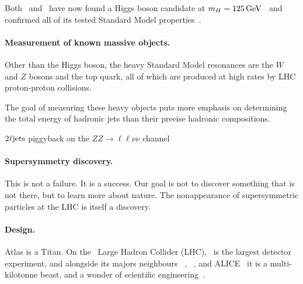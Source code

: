 Both \atlas\ and \cms\ have now found a Higgs boson candidate at
$m_H = 125\,\eV[G]$~\cite{
atlas2012higgs,
atlas2012combined,
cms2012higgs
}
and confirmed all of its tested Standard Model properties~\cite{
combined2016higgs,
atlas2022ten,
cms2022ten
}.

\paragraph{Measurement of known massive objects.}
Other than the Higgs boson, the heavy Standard Model resonances are the
$W$ and $Z$ bosons and the top quark, all of which are produced at
high rates by LHC proton-proton collisions.

The goal of measuring these heavy objects puts more emphasis on determining
the total energy of hadronic jets than their precise hadronic compositions.









$\twoljets$ piggyback on the $ZZ \to \ell\ell\nu\nu$ channel



\paragraph{Supersymmetry discovery.}
This is not a failure. It is a success.
Our goal is not to discover something that is not there, but to learn more
about nature.
The nonappearance of supersymmetric particles at the LHC is itself a discovery.


\paragraph{Design.}
Atlas is a Titan.
On the \cern\ Large Hadron Collider (LHC), \atlas\ is the largest detector
experiment, and alongside its majors neighbours
\cms~\cite{cms2008experiment},
\lhcb~\cite{lhcb2008experiment},
and ALICE~\cite{alice2008experiment}
it is a multi-kilotonne beast,
and a wonder of scientific engineering~\cite{
atlas2008experiment,
atlas1999design1,
atlas1999design2
}.

